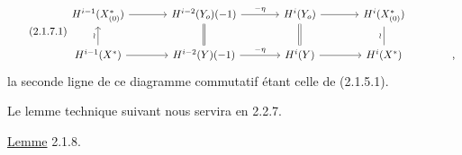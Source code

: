 
\begin{equation}\tag{2.1.7.1}
\begin{tikzcd}[column sep=large]
H^{i-1}(X^*_{(0)}) \arrow[r] & H^{i-2}(Y_o)(-1) \arrow[r, "-\eta"] & H^i(Y_o) \arrow[r] & H^i(X^*_{(0)}) & {} \\
H^{i-1}(X^*) \arrow[r] \arrow[u, "\wr"] & H^{i-2}(Y)(-1) \arrow[r, "-\eta"] \arrow[u, equal] & H^i(Y) \arrow[r] \arrow[u, equal] & H^i(X^*) \arrow[u, dash, "\wr"] & \mbox{,}
\end{tikzcd}
\end{equation}
la seconde ligne de ce diagramme commutatif étant celle de (2.1.5.1).

Le lemme technique suivant nous servira en 2.2.7.

\underline{Lemme} 2.1.8.

